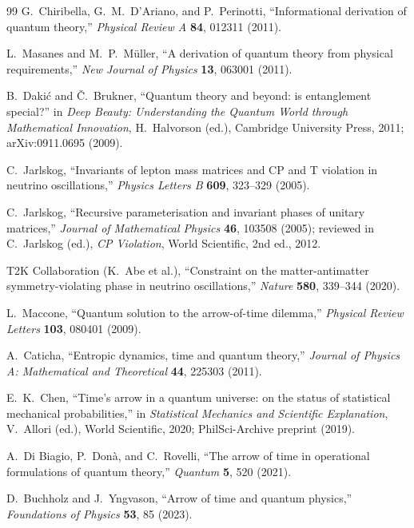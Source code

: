 \documentclass[11pt]{article}
\begin{document}
\begin{thebibliography}{99}
G.\ Chiribella, G.\ M.\ D'Ariano, and P.\ Perinotti, ``Informational derivation of quantum theory,''
\emph{Physical Review A} \textbf{84}, 012311 (2011).

L.\ Masanes and M.\ P.\ M\"uller, ``A derivation of quantum theory from physical requirements,''
\emph{New Journal of Physics} \textbf{13}, 063001 (2011).

B.\ Daki\'c and \v{C}.\ Brukner, ``Quantum theory and beyond: is entanglement special?'' in \emph{Deep Beauty: Understanding the Quantum World through Mathematical Innovation}, H.\ Halvorson (ed.), Cambridge University Press, 2011; arXiv:0911.0695 (2009).

C.\ Jarlskog, ``Invariants of lepton mass matrices and CP and T violation in neutrino oscillations,''
\emph{Physics Letters B} \textbf{609}, 323--329 (2005).

C.\ Jarlskog, ``Recursive parameterisation and invariant phases of unitary matrices,''
\emph{Journal of Mathematical Physics} \textbf{46}, 103508 (2005); reviewed in C.\ Jarlskog (ed.), \emph{CP Violation}, World Scientific, 2nd ed., 2012.

T2K Collaboration (K.\ Abe et al.), ``Constraint on the matter-antimatter symmetry-violating phase in neutrino oscillations,''
\emph{Nature} \textbf{580}, 339--344 (2020).

L.\ Maccone, ``Quantum solution to the arrow-of-time dilemma,''
\emph{Physical Review Letters} \textbf{103}, 080401 (2009).

A.\ Caticha, ``Entropic dynamics, time and quantum theory,''
\emph{Journal of Physics A: Mathematical and Theoretical} \textbf{44}, 225303 (2011).

E.\ K.\ Chen, ``Time's arrow in a quantum universe: on the status of statistical mechanical probabilities,'' in \emph{Statistical Mechanics and Scientific Explanation}, V.\ Allori (ed.), World Scientific, 2020; PhilSci-Archive preprint (2019).

A.\ Di Biagio, P.\ Don\`a, and C.\ Rovelli, ``The arrow of time in operational formulations of quantum theory,''
\emph{Quantum} \textbf{5}, 520 (2021).

D.\ Buchholz and J.\ Yngvason, ``Arrow of time and quantum physics,''
\emph{Foundations of Physics} \textbf{53}, 85 (2023).


\end{thebibliography}
\end{document}
